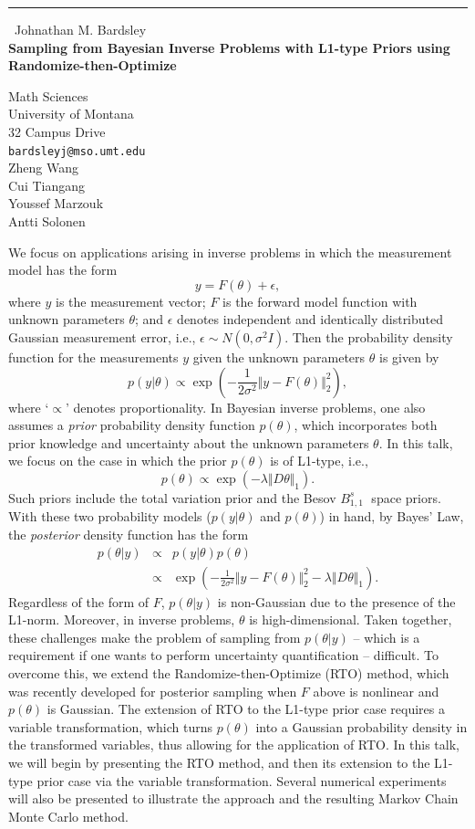 \documentclass{report}
\begin{document}
\begin{center}
\rule{6in}{1pt} \
{\large Johnathan M. Bardsley \\
{\bf Sampling from Bayesian Inverse Problems with L1-type Priors using Randomize-then-Optimize}}

Math Sciences \\ University of Montana \\ 32 Campus Drive
\\
{\tt bardsleyj@mso.umt.edu}\\
Zheng Wang\\
Cui Tiangang\\
Youssef Marzouk\\
Antti Solonen\end{center}

We focus on applications arising in inverse problems in which the
measurement model has the form
$$
y = F(\theta)+\epsilon,
$$
where $y$ is the measurement vector; $F$ is the forward model function
with unknown parameters $\theta$; and $\epsilon$ denotes independent and
identically distributed
Gaussian measurement error, i.e., $\epsilon\sim N(0,\sigma^2 I)$.
Then the probability density function for the measurements $y$ given the
unknown parameters $\theta$ is given by
$$
p(y|\theta)\propto\exp\left(-\frac{1}{2\sigma^2}\Vert y-F(\theta)\Vert^2_2\right),
$$
where `$\propto$' denotes proportionality. In Bayesian inverse problems,
one also assumes a {\em prior} probability density function $p(\theta)$,
which incorporates both prior knowledge and uncertainty about the unknown
parameters $\theta$. In this talk, we focus on the case in which
the prior $p(\theta)$ is of L1-type, i.e.,
$$
p(\theta)\propto \exp\left(-\lambda \Vert D\theta\Vert_1\right).
$$
Such priors include the total variation prior and the Besov $B_{1,1}^s\;$ space priors.
With these two probability models ($p(y|\theta)$ and $p(\theta)$) in
hand, by Bayes' Law, the {\em posterior} density function has the form
\begin{eqnarray*}
p(\theta|y)&\propto& p(y|\theta)p(\theta)\\
&\propto& \exp\left(-\frac{1}{2\sigma^2}\Vert
y-F(\theta)\Vert^2_2-\lambda \Vert D\theta\Vert_1\right).
\end{eqnarray*}
Regardless of the form of $F$, $p(\theta|y)$ is non-Gaussian due to the
presence of the L1-norm. Moreover, in inverse problems, $\theta$ is
high-dimensional. Taken together,
these challenges make the problem of sampling from $p(\theta|y)$ -- which
is a requirement if one wants to perform uncertainty quantification --
difficult.
To overcome this, we extend the Randomize-then-Optimize (RTO) method,
which was recently developed for posterior sampling when $F$ above is
nonlinear and $p(\theta)$ is Gaussian.
The extension of RTO to the L1-type prior case requires a variable
transformation, which turns $p(\theta)$ into a Gaussian probability
density
in the transformed variables, thus allowing for the application of RTO.
In this talk, we will begin by presenting the RTO method, and then its
extension to the L1-type prior case via the variable transformation.
Several numerical experiments will also be presented to illustrate the
approach and the resulting Markov Chain Monte Carlo method.
\end{document}
